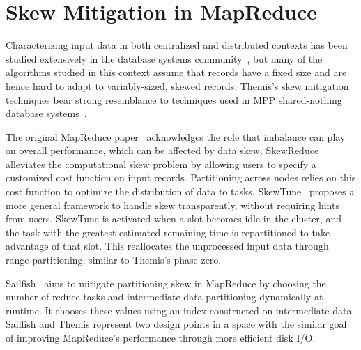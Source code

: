 \section{Skew Mitigation in MapReduce}

Characterizing input data in both centralized and distributed contexts has been
studied extensively in the database systems
community~\cite{Manku99,DataSkeletons,Hadjieleftheriou2005}, but many of the
algorithms studied in this context assume that records have a fixed size and
are hence hard to adapt to variably-sized, skewed records. Themis's skew
mitigation techniques bear strong resemblance to techniques used in MPP
shared-nothing database systems~\cite{DeWittGraySkew}.

The original MapReduce paper~\cite{mapreduce} acknowledges the role that
imbalance can play on overall performance, which can be affected by data skew.
SkewReduce~\cite{SkewReduce} alleviates the computational skew problem by
allowing users to specify a customized cost function on input records.
Partitioning across nodes relies on this cost function to optimize the
distribution of data to tasks.  SkewTune~\cite{SkewTune} proposes a more
general framework to handle skew transparently, without requiring hints from
users.  SkewTune is activated when a slot becomes idle in the cluster, and
the task with the greatest estimated remaining time is repartitioned to take
advantage of that slot.  This reallocates the unprocessed input data through
range-partitioning, similar to Themis's phase zero.

Sailfish~\cite{sailfish} aims to mitigate partitioning skew in MapReduce by
choosing the number of reduce tasks and intermediate data partitioning
dynamically at runtime. It chooses these values using an index constructed on
intermediate data. Sailfish and Themis represent two design points in a space
with the similar goal of improving MapReduce's performance through more
efficient disk I/O.
